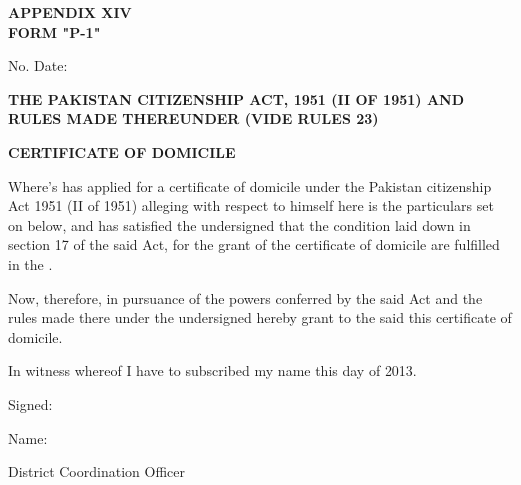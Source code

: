 \documentclass{article}
\begin{document}
\begin{center}
\textbf{APPENDIX XIV} \\
\textbf{FORM "P-1"}
\end{center}

\vspace{0.5cm}

No. \hspace{5cm} Date: \underline{\hspace{5cm}}

\vspace{0.5cm}

\textbf{THE PAKISTAN CITIZENSHIP ACT, 1951 (II OF 1951) AND RULES MADE THEREUNDER (VIDE RULES 23)}

\vspace{0.5cm}

\hrulefill
\begin{center}
\textbf{CERTIFICATE OF DOMICILE}
\end{center}
\hrulefill

\vspace{0.5cm}

Where's \underline{\hspace{8cm}} has applied for a certificate of domicile under the Pakistan citizenship Act 1951 (II of 1951) alleging with respect to himself here is the particulars set on below, and has satisfied the undersigned that the condition laid down in section 17 of the said Act, for the grant of the certificate of domicile are fulfilled in the \underline{\hspace{5cm}}.

Now, therefore, in pursuance of the powers conferred by the said \underline{\hspace{5cm}} Act and the rules made there under the undersigned hereby grant to the said this certificate of domicile.

\vspace{0.5cm}

In witness whereof I have to subscribed my name this day of \underline{\hspace{3cm}} 2013.

\vspace{0.5cm}

Signed: \underline{\hspace{5cm}}

Name: \underline{\hspace{5cm}}

District Coordination Officer \underline{\hspace{5cm}}
\end{document}
